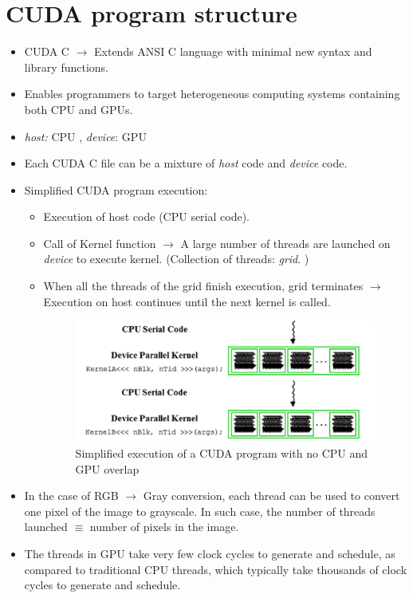 \section{CUDA program structure}
\begin{itemize}
    \item CUDA C $\rightarrow$ Extends ANSI C language with minimal new syntax and library functions.
    \item Enables programmers to target heterogeneous computing systems containing both CPU and GPUs.
    \item \textit{host: } CPU ,  \textit{device}: GPU
    \item Each CUDA C file can be a mixture of \textit{host} code and \textit{device} code.
    \item Simplified CUDA program execution:
          \begin{itemize}
              \item Execution of host code (CPU serial code).
              \item Call of Kernel function $\rightarrow$ A large number of threads are launched on \textit{device} to execute kernel. (Collection of threads: \textit{grid}. )
              \item When all the threads of the grid finish execution, grid terminates $\rightarrow$ Execution on host continues until the next kernel is called.
                    \begin{figure}[!t]
                        \centering
                        \includegraphics[width=0.75\linewidth]{Images/DP/cuda_exec.png}
                        \caption{Simplified execution of a CUDA program with no CPU and GPU overlap}
                        \label{fig:dp_cuda_exec}
                    \end{figure}
          \end{itemize}
    \item In the case of RGB $\rightarrow$ Gray conversion, each thread can be used to convert one pixel of the image to grayscale. In such case, the number of threads launched $\equiv$ number of pixels in the image.
    \item The threads in GPU take very few clock cycles to generate and schedule, as compared to traditional CPU threads, which typically take thousands of clock cycles to generate and schedule.


\end{itemize}
